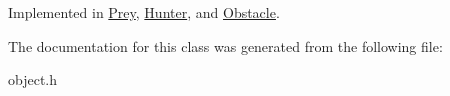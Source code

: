 Implemented in \hyperlink{classPrey_a46d5447bf01e734154f8d3f2f27c8fcd}{Prey}, \hyperlink{classHunter_a9b193792622fd203df15bf755753e9bd}{Hunter}, and \hyperlink{classObstacle_ad4355e9d1db002f6db2ca15ae5605d05}{Obstacle}.



The documentation for this class was generated from the following file:\begin{DoxyCompactItemize}
\item 
object.h\end{DoxyCompactItemize}
